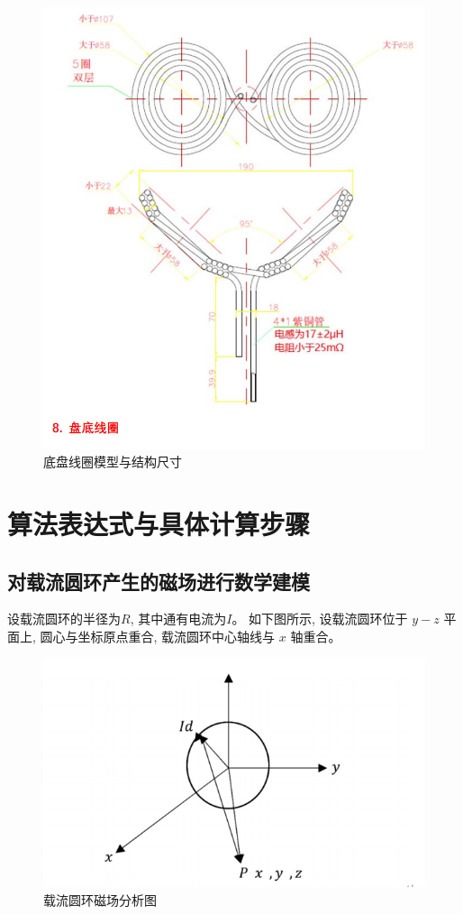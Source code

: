 \documentclass{article}
\begin{document}
\begin{figure}[h]
  \centering
  \includegraphics[scale=0.4]{constr.png}
  \caption{底盘线圈模型与结构尺寸}
  \label{fig:example}
\end{figure}
\newpage

\section{算法表达式与具体计算步骤}
\subsection{对载流圆环产生的磁场进行数学建模}
设载流圆环的半径为$R$, 其中通有电流为$I$。 如下图所示, 设载流圆环位于 $y-z$ 平面上, 圆心与坐标原点重合, 载流圆环中心轴线与 $x$ 轴重合。

\begin{figure}[h]
  \centering
  \includegraphics[scale=0.4]{coil.png}
  \caption{载流圆环磁场分析图}
  \label{fig:example}
\end{figure}
\end{document}
